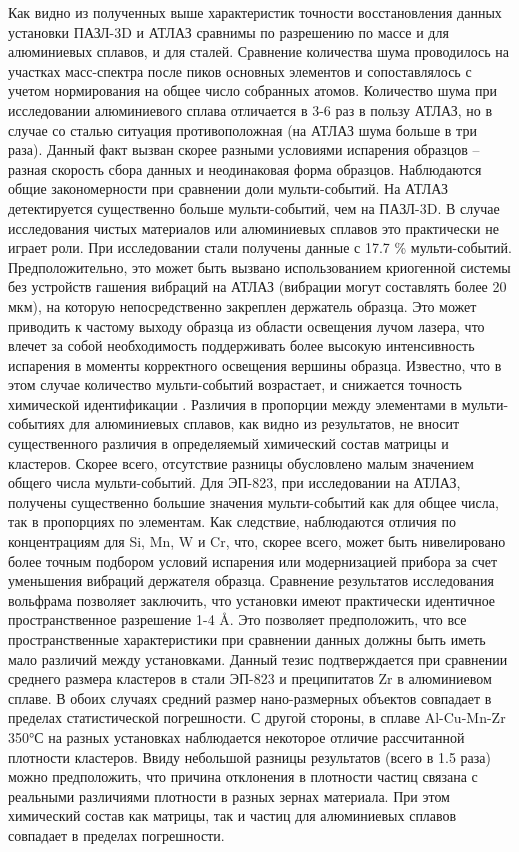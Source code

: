 Как видно из полученных выше характеристик точности восстановления данных установки ПАЗЛ-3D и АТЛАЗ сравнимы по разрешению по массе и для алюминиевых сплавов, и для сталей. Сравнение количества шума проводилось на участках масс-спектра после пиков основных элементов и сопоставлялось с учетом нормирования на общее число собранных атомов. Количество шума при исследовании алюминиевого сплава отличается в 3-6 раз в пользу АТЛАЗ, но в случае со сталью ситуация противоположная (на АТЛАЗ шума больше в три раза). Данный факт вызван скорее разными условиями испарения образцов – разная скорость сбора данных и неодинаковая форма образцов. Наблюдаются общие закономерности при сравнении доли мульти-событий. На АТЛАЗ детектируется существенно больше мульти-событий, чем на ПАЗЛ-3D. В случае исследования чистых материалов или алюминиевых сплавов это практически не играет роли. При исследовании стали получены данные с 17.7 \% мульти-событий. Предположительно, это может быть вызвано использованием криогенной системы без устройств гашения вибраций на АТЛАЗ (вибрации могут составлять более 20 мкм), на которую непосредственно закреплен держатель образца. Это может приводить к частому выходу образца из области освещения лучом лазера, что влечет за собой необходимость поддерживать более высокую интенсивность испарения в моменты корректного освещения вершины образца. Известно, что в этом случае количество мульти-событий возрастает, и снижается точность химической идентификации \cite{scbibOptParamsYAFI}. Различия в пропорции между элементами в мульти-событиях для алюминиевых сплавов, как видно из результатов, не вносит существенного различия в определяемый химический состав матрицы и кластеров. Скорее всего, отсутствие разницы обусловлено малым значением общего числа мульти-событий. Для ЭП-823, при исследовании на АТЛАЗ, получены существенно большие значения мульти-событий как для общее числа, так в пропорциях по элементам. Как следствие, наблюдаются отличия по концентрациям для Si, Mn, W и Cr, что, скорее всего, может быть нивелировано более точным подбором условий испарения или модернизацией прибора за счет уменьшения вибраций держателя образца.
Сравнение результатов исследования вольфрама позволяет заключить, что установки имеют практически идентичное пространственное разрешение 1-4 \r{A}. Это позволяет предположить, что все пространственные характеристики при сравнении данных должны быть иметь мало различий между установками. Данный тезис подтверждается при сравнении среднего размера кластеров в стали ЭП-823 и преципитатов Zr в алюминиевом сплаве. В обоих случаях средний размер нано-размерных объектов совпадает в пределах статистической погрешности. С другой стороны, в сплаве Al-Cu-Mn-Zr 350°С на разных установках наблюдается некоторое отличие рассчитанной плотности кластеров. Ввиду небольшой разницы результатов (всего в 1.5 раза) можно предположить, что причина отклонения в плотности частиц связана с реальными различиями плотности в разных зернах материала. При этом химический состав как матрицы, так и частиц для алюминиевых сплавов совпадает в пределах погрешности.

